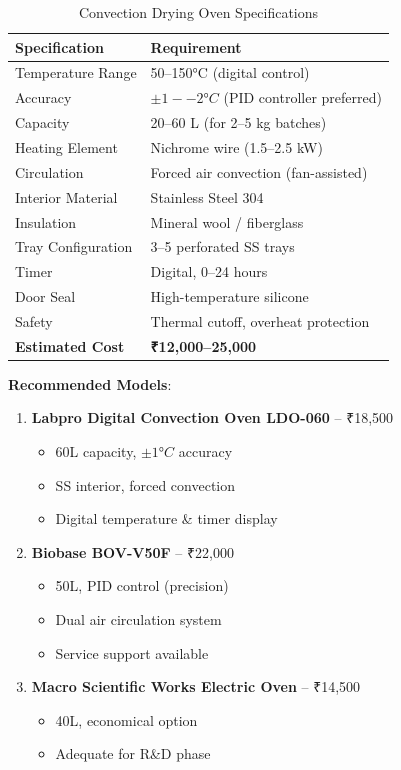 \documentclass[12pt,a4paper]{article}
\begin{document}
\begin{table}[h]
\centering
\begin{tabular}{p{5cm}p{8cm}}
\toprule
\textbf{Specification} & \textbf{Requirement} \\
\midrule
Temperature Range & 50--150°C (digital control) \\
Accuracy & $\pm 1--2°C$ (PID controller preferred) \\
Capacity & 20--60 L (for 2--5 kg batches) \\
Heating Element & Nichrome wire (1.5--2.5 kW) \\
Circulation & Forced air convection (fan-assisted) \\
Interior Material & Stainless Steel 304 \\
Insulation & Mineral wool / fiberglass \\
Tray Configuration & 3--5 perforated SS trays \\
Timer & Digital, 0--24 hours \\
Door Seal & High-temperature silicone \\
Safety & Thermal cutoff, overheat protection \\
\textbf{Estimated Cost} & \textbf{₹12,000--25,000} \\
\bottomrule
\end{tabular}
\caption{Convection Drying Oven Specifications}
\end{table}

\textbf{Recommended Models}:
\begin{enumerate}
    \item \textbf{Labpro Digital Convection Oven LDO-060} -- ₹18,500
    \begin{itemize}
        \item 60L capacity, $\pm 1°C$ accuracy
        \item SS interior, forced convection
        \item Digital temperature \& timer display
    \end{itemize}
    \item \textbf{Biobase BOV-V50F} -- ₹22,000
    \begin{itemize}
        \item 50L, PID control (precision)
        \item Dual air circulation system
        \item Service support available
    \end{itemize}
    \item \textbf{Macro Scientific Works Electric Oven} -- ₹14,500
    \begin{itemize}
        \item 40L, economical option
        \item Adequate for R\&D phase
    \end{itemize}
\end{enumerate}
\end{document}
